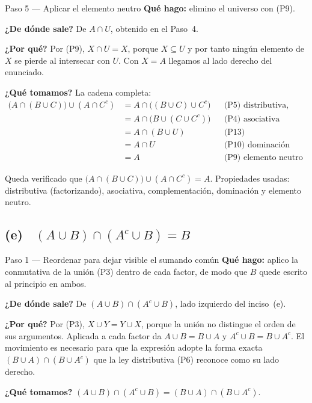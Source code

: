 \documentclass[11pt]{article}
\begin{document}
\begin{paso}{Paso 5 --- Aplicar el elemento neutro}
\textbf{Qué hago:} elimino el universo con (P9).

\textbf{¿De dónde sale?} De $A\cap U$, obtenido en el Paso~4.

\textbf{¿Por qué?} Por (P9), $X\cap U=X$, porque $X\subseteq U$ y por tanto ningún elemento de
$X$ se pierde al intersecar con $U$. Con $X=A$ llegamos al lado derecho del enunciado.

\textbf{¿Qué tomamos?} La cadena completa:
\begin{align*}
\bigl(A\cap(B\cup C)\bigr)\cup(A\cap C^{c})
&=A\cap\bigl((B\cup C)\cup C^{c}\bigr) && \text{(P5) distributiva, factorizando}\\
&=A\cap\bigl(B\cup(C\cup C^{c})\bigr) && \text{(P4) asociativa}\\
&=A\cap(B\cup U) && \text{(P13) complementación}\\
&=A\cap U && \text{(P10) dominación}\\
&=A && \text{(P9) elemento neutro}
\end{align*}
\end{paso}

\begin{resp}
Queda verificado que $\bigl(A\cap(B\cup C)\bigr)\cup(A\cap C^{c})=A$. Propiedades usadas:
distributiva (factorizando), asociativa, complementación, dominación y elemento neutro.
\end{resp}

\subsection*{(e) \ $(A\cup B)\cap(A^{c}\cup B)=B$}

\begin{paso}{Paso 1 --- Reordenar para dejar visible el sumando común}
\textbf{Qué hago:} aplico la conmutativa de la unión (P3) dentro de cada factor, de modo que $B$
quede escrito al principio en ambos.

\textbf{¿De dónde sale?} De $(A\cup B)\cap(A^{c}\cup B)$, lado izquierdo del inciso~(e).

\textbf{¿Por qué?} Por (P3), $X\cup Y=Y\cup X$, porque la unión no distingue el orden de sus
argumentos. Aplicada a cada factor da $A\cup B=B\cup A$ y $A^{c}\cup B=B\cup A^{c}$. El
movimiento es necesario para que la expresión adopte la forma exacta $(B\cup A)\cap(B\cup A^{c})$
que la ley distributiva (P6) reconoce como su lado derecho.

\textbf{¿Qué tomamos?} $(A\cup B)\cap(A^{c}\cup B)=(B\cup A)\cap(B\cup A^{c})$.
\end{paso}
\end{document}
